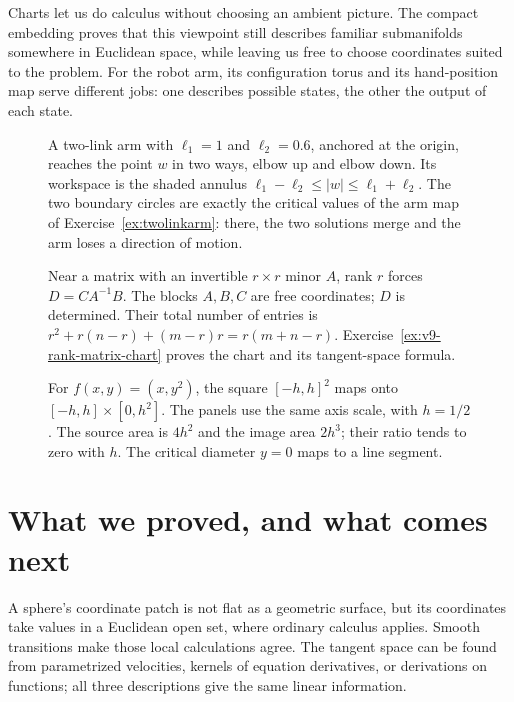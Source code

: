 Charts let us do calculus without choosing an ambient picture. The compact embedding proves that this viewpoint still describes familiar submanifolds somewhere in Euclidean space, while leaving us free to choose coordinates suited to the problem. For the robot arm, its configuration torus and its hand-position map serve different jobs: one describes possible states, the other the output of each state.

\begin{figure}[ht]
\centering
{}
\caption{A two-link arm with $\ell_1=1$ and $\ell_2=0.6$, anchored at the origin, reaches the point $w$ in two ways, elbow up and elbow down. Its
workspace is the shaded annulus $\ell_1-\ell_2\le|w|\le\ell_1+\ell_2$. The two boundary circles are exactly the critical values of the arm map of
Exercise~\ref{ex:twolinkarm}: there, the two solutions merge and the arm loses a direction of motion.}
\label{fig:arm}
\end{figure}

\begin{figure}[ht]
\centering
{}
\caption{Near a matrix with an invertible $r\times r$ minor $A$, rank $r$ forces $D=CA^{-1}B$. The blocks $A,B,C$ are free coordinates; $D$ is determined. Their total number of entries is $r^2+r(n-r)+(m-r)r=r(m+n-r)$. Exercise~\ref{ex:v9-rank-matrix-chart} proves the chart and its tangent-space formula.}
\label{fig:v9-rank-matrix-chart}
\end{figure}

\begin{figure}[ht]
\centering
{}
\caption{For $f(x,y)=(x,y^2)$, the square $[-h,h]^2$ maps onto $[-h,h]\times[0,h^2]$. The panels use the same axis scale, with $h=1/2$. The source area is $4h^2$ and the image area $2h^3$; their ratio tends to zero with $h$. The critical diameter $y=0$ maps to a line segment.}
\label{fig:v9-critical-image}
\end{figure}

\section{What we proved, and what comes next}

A sphere's coordinate patch is not flat as a geometric surface, but its coordinates take values in a Euclidean open set, where ordinary calculus applies. Smooth transitions make those local calculations agree. The tangent space can be found from parametrized velocities, kernels of equation derivatives, or derivations on functions; all three descriptions give the same linear information.

